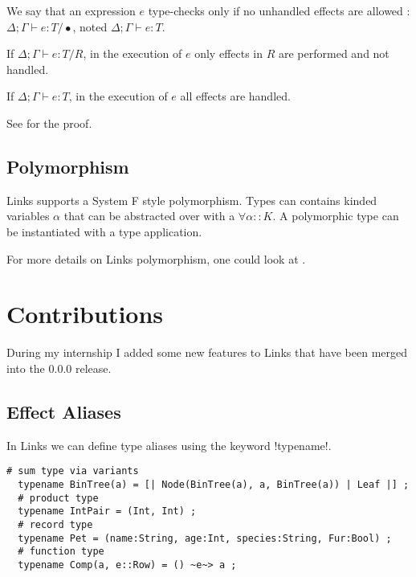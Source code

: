 \documentclass[11pt, nonacm=true, language=french, language=english]{acmart}
\begin{document}
We say that an expression $e$ type-checks only if no unhandled effects are allowed : $\Delta;\Gamma \vdash e : T / \bullet$, noted $\Delta;\Gamma \vdash e : T$.


\begin{thm}
  If $\Delta;\Gamma \vdash e : T / R$, in the execution of $e$ only effects in $R$ are performed and not handled.
\end{thm}
\begin{cor}
  If $\Delta;\Gamma \vdash e : T$, in the execution of $e$ all effects are handled.
\end{cor}

See \citep{links-effect} for the proof.


\subsection{Polymorphism}

Links supports a System F \cite{proof-type-girard} style polymorphism. Types can contains kinded variables $\alpha$ that can be abstracted over with a $\forall \alpha :: K$. A polymorphic type can be instantiated with a type application.

For more details on Links polymorphism, one could look at \cite{polymorph-rpc-links}.



\section{Contributions}

During my internship I added some new features to Links that have been merged into the 0.0.0 release.

\subsection{Effect Aliases}

In Links we can define type aliases using the keyword !typename!.
\begin{lstlisting}[caption=Type alias examples]
  # sum type via variants
  typename BinTree(a) = [| Node(BinTree(a), a, BinTree(a)) | Leaf |] ;
  # product type
  typename IntPair = (Int, Int) ;
  # record type
  typename Pet = (name:String, age:Int, species:String, Fur:Bool) ;
  # function type
  typename Comp(a, e::Row) = () ~e~> a ;
\end{lstlisting}
\end{document}
